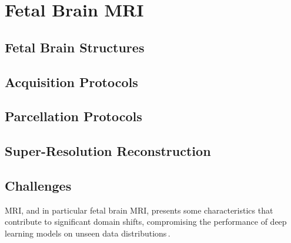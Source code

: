 \chapter{Fetal Brain MRI} \label{chap:FetalBrainMRI}
\vspace{1cm}


\section{Fetal Brain Structures}

\section{Acquisition Protocols}

\section{Parcellation Protocols}

\section{Super-Resolution Reconstruction} \label{sec:SuperResolutionReconstruction}

\section{Challenges} \label{sec:Challenges}
MRI, and in particular fetal brain MRI, presents some characteristics that contribute to significant domain shifts, compromising the performance of deep learning models on unseen data distributions\,\cite{FeTA2024_paper, FeTA2024_review}.

